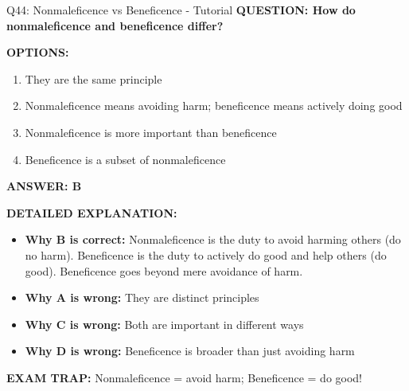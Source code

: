\documentclass[8pt]{beamer}
\begin{document}
	\begin{frame}{Q44: Nonmaleficence vs Beneficence - Tutorial}
		\fontsize{6.5}{7.5}\selectfont
		\textbf{QUESTION: How do nonmaleficence and beneficence differ?}
		
		\vspace{0.1cm}
		\textbf{OPTIONS:}
		\begin{enumerate}
			\item They are the same principle
			\item Nonmaleficence means avoiding harm; beneficence means actively doing good
			\item Nonmaleficence is more important than beneficence
			\item Beneficence is a subset of nonmaleficence
		\end{enumerate}
		
		\vspace{0.1cm}
		\textcolor{myblue}{\textbf{ANSWER: B}}
		
		\vspace{0.1cm}
		\textbf{DETAILED EXPLANATION:}
		\begin{itemize}
			\item \textbf{Why B is correct:} Nonmaleficence is the duty to avoid harming others (do no harm). Beneficence is the duty to actively do good and help others (do good). Beneficence goes beyond mere avoidance of harm.
			\item \textbf{Why A is wrong:} They are distinct principles
			\item \textbf{Why C is wrong:} Both are important in different ways
			\item \textbf{Why D is wrong:} Beneficence is broader than just avoiding harm
		\end{itemize}
		
		\textcolor{myred}{\textbf{EXAM TRAP:}} Nonmaleficence = \textcolor{myblue}{avoid harm}; Beneficence = \textcolor{myblue}{do good}!
	\end{frame}
	
\end{document}
